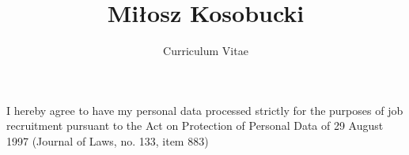 \documentclass[english]{curve}
\title{Miłosz Kosobucki}
\subtitle{Curriculum Vitae}
\newcommand{\inPolish}[1]{}
\newcommand{\inEnglish}[1]{#1}
\begin{document}
\newcommand{\CC}{C\nolinebreak\hspace{-.05em}\raisebox{.4ex}{\tiny\textbf+}\nolinebreak\hspace{-.10em}\raisebox{.4ex}{\tiny\textbf+}}
\newcommand{\GTK}{GTK\nolinebreak\hspace{-.05em}\raisebox{.4ex}{\tiny\textbf+}}

\prefix{}
\makeheaders
\maketitle
{}
\vfill
\inEnglish{I hereby agree to have my personal data processed strictly for the purposes of job recruitment pursuant to the Act on Protection of Personal Data of 29 August 1997 (Journal of Laws, no. 133, item 883)}
\inPolish{Wyrażam zgodę na przetwarzanie moich danych osobowych dla potrzeb niezbędnych do realizacji
procesu rekrutacji zgodnie z Ustawą z dn. 29.08.97 o Ochronie Danych Osobowych, Dz. Ust. Nr 133 poz.
883.}
\end{document}
